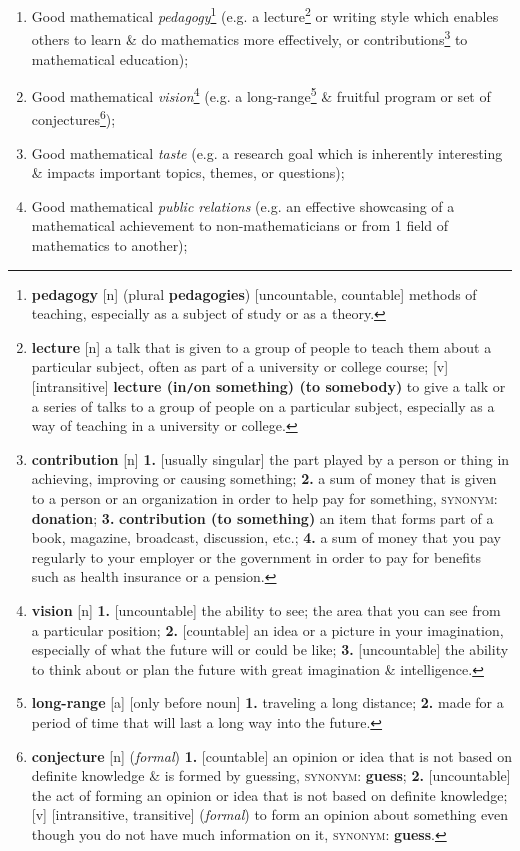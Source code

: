 \documentclass[oneside]{book}
\numberwithin{equation}{section}
\begin{document}
\begin{enumerate}
	\item Good mathematical \textit{pedagogy}\footnote{\textbf{pedagogy} [n] (plural \textbf{pedagogies}) [uncountable, countable] methods of teaching, especially as a subject of study or as a theory.} (e.g. a lecture\footnote{\textbf{lecture} [n] a talk that is given to a group of people to teach them about a particular subject, often as part of a university or college course; [v] [intransitive] \textbf{lecture (in\texttt{/}on something) (to somebody)} to give a talk or a series of talks to a group of people on a particular subject, especially as a way of teaching in a university or college.} or writing style which enables others to learn \& do mathematics more effectively, or contributions\footnote{\textbf{contribution} [n] \textbf{1.} [usually singular] the part played by a person or thing in achieving, improving or causing something; \textbf{2.} a sum of money that is given to a person or an organization in order to help pay for something, \textsc{synonym}: \textbf{donation}; \textbf{3.} \textbf{contribution (to something)} an item that forms part of a book, magazine, broadcast, discussion, etc.; \textbf{4.} a sum of money that you pay regularly to your employer or the government in order to pay for benefits such as health insurance or a pension.} to mathematical education);
	\item Good mathematical \textit{vision}\footnote{\textbf{vision} [n] \textbf{1.} [uncountable] the ability to see; the area that you can see from a particular position; \textbf{2.} [countable] an idea or a picture in your imagination, especially of what the future will or could be like; \textbf{3.} [uncountable] the ability to think about or plan the future with great imagination \& intelligence.} (e.g. a long-range\footnote{\textbf{long-range} [a] [only before noun] \textbf{1.} traveling a long distance; \textbf{2.} made for a period of time that will last a long way into the future.} \& fruitful program or set of conjectures\footnote{\textbf{conjecture} [n] (\textit{formal}) \textbf{1.} [countable] an opinion or idea that is not based on definite knowledge \& is formed by guessing, \textsc{synonym}: \textbf{guess}; \textbf{2.} [uncountable] the act of forming an opinion or idea that is not based on definite knowledge; [v] [intransitive, transitive] (\textit{formal}) to form an opinion about something even though you do not have much information on it, \textsc{synonym}: \textbf{guess}.});
	\item Good mathematical \textit{taste} (e.g. a research goal which is inherently interesting \& impacts important topics, themes, or questions);
	\item Good mathematical \textit{public relations} (e.g. an effective showcasing of a mathematical achievement to non-mathematicians or from 1 field of mathematics to another);
\end{enumerate}  





\printbibliography[heading=bibintoc]
	
\end{document}
